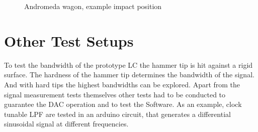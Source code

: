 \begin{figure}[!htb]
    \centering
        \hspace{4em}
    \caption[Andromeda Example Positions]{Andromeda wagon, example impact position}
    \label{fig:andromeda_positions}
\end{figure}

\section{Other Test Setups}

To test the bandwidth of the prototype \ac{LC} the hammer tip is hit against a rigid surface. The hardness of the hammer tip determines the bandwidth of the signal. And with hard tips the highest bandwidths can be explored. Apart from the signal measurement tests themselves other tests had to be conducted to guarantee the \ac{DAC} operation and to test the Software. As an example, clock tunable \ac{LPF} are tested in an arduino circuit, that generates a differential sinusoidal signal at different frequencies.


